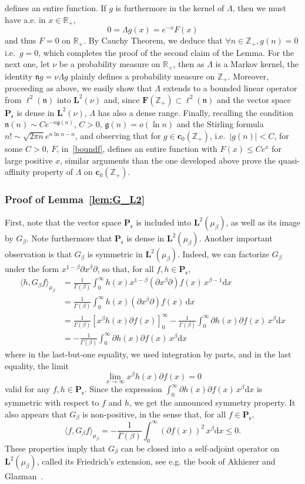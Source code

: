 \documentclass[10pt]{amsart}
\theoremstyle{definition}\newtheorem{defi}[theo]{Definition}\newtheorem{rema}[theo]{Remark}\newtheorem{exam}[theo]{Example}\newtheorem{exem}[theo]{Example}\newtheorem{nota}[theo]{Notation}
\newcommand{\RR}{\mathbb{R}}
\newcommand{\ZZ}{\mathbb{Z}}
\newcommand{\fe}{\mathfrak{e}}
\newcommand{\iy}{\infty}
\newcommand{\lt}{\left}
\newcommand{\pa}{\partial}
\newcommand{\ri}{\rightarrow}
\newcommand{\rt}{\right}
\newcommand{\Bg}{G}
\newcommand{\esP}{\mathbf{P}}
\newcommand{\esL}{\mathbf{L}}
\newcommand{\esLd}{\ell}
\newcommand{\esF}{\mathbf{F}}
\newcommand{\esc}{\mathbf{c}}
\newcommand{\esPe}{\esP_{\! \fe}}
\let\oldforall\forall
\renewcommand*{\forall}{\mathrel{\oldforall}}
\newcommand*{\dd}{\mathrm{d}}
\newcommand*{\dx}{\dd x}
\begin{document}
defines an entire function. If $g$ is furthermore in the kernel of $\Lambda$, then we must have a.e. in $x\in\RR_+$,
\[
0 = \Lambda g(x) = e^{-x}F(x)
\]
and thus $F=0$ on $\RR_+$. By Cauchy Theorem, we deduce that $\forall n\in\ZZ_+, g(n) =0$ i.e.~$g=0$, which completes the proof of the second claim of the Lemma. For the next one, let $\nu$ be a probability measure on $\RR_+$, then as $\Lambda$ is a Markov kernel, the identity $\mathfrak n g = \nu \Lambda g$ plainly defines a probability measure on $\ZZ_+$. Moreover, proceeding as above, we easily show that $\Lambda$ extends to a bounded linear operator from $\esLd^2(\mathfrak n)$ into $\esL^2(\nu)$ and, since $\esF(\ZZ_+) \subset \esLd^2(\mathfrak n) $ and the vector space $\esPe$ is dense in $\esL^2(\nu)$, $\Lambda$ has also a dense range. Finally, recalling the condition $\mathfrak{n}(n)\sim C e^{-n \mathfrak{g}(n)}$, $C>0$, $\mathfrak{g}(n)=o(\ln n)$ and the Stirling formula $n! \sim \sqrt{2 \pi n}e^{n \ln n -n}$, and observing that for $g\in \esc_0(\ZZ_+)$, i.e.~$|g(n)|<C $, for some $C>0$, $F$, in~\eqref{boundf}, defines an entire function with $F(x)\leq C e^{x}$ for large positive $x$, similar arguments than the one developed above prove the quasi-affinity property of $\Lambda$ on $\esc_0(\ZZ_+)$.


\subsubsection{Proof of Lemma~\ref{lem:G_L2}} First, note that the vector space $\esPe$ is included into $\esL^2(\mu_{\beta})$, as well as its image by $\Bg_{\beta}$. Note furthermore that $\esPe$ is dense in $\esL^2(\mu_{\beta})$. Another important observation is that $\Bg_{\beta}$ is symmetric in $\esL^2(\mu_{\beta})$. Indeed, we can factorize $\Bg_{\beta}$ under the form $x^{1-\beta}\pa x^{\beta}\pa$, so that, for all $ f, h \in \esPe,$
\begin{align*}
\langle h,\Bg_{\beta} f\rangle_{\mu_{\beta}}&=\frac1{\Gamma(\beta)}\int_0^{\iy} h(x) x^{1-\beta}(\pa x^{\beta}\pa) f(x)\, x^{\beta-1}\dx\\
&=\frac1{\Gamma(\beta)}\int_0^{\iy} h(x) (\pa x^{\beta}\pa) f(x)\, \dx\\
&=\frac1{\Gamma(\beta)}\lt[x^{\beta}h(x)\pa f(x)\rt]_0^{\iy}-\frac1{\Gamma(\beta)}\int_0^{\iy }
\pa h(x) \pa f(x)\, x^{\beta} \dx\\
&=-\frac1{\Gamma(\beta)}\int_0^{\iy}
\pa h(x) \pa f(x)\, x^{\beta} \dx
\end{align*}
where in the last-but-one equality, we used integration by parts, and in the last equality, the limit
\[
\lim_{x\ri\iy } x^{\beta}h(x)\pa f(x)=0
\]
valid for any $f,h\in\esPe$. Since the expression $\int_0^{\iy }
\pa h(x) \pa f(x)\, x^{\beta} \dx$ is symmetric with respect to $f$ and $h$, we get the announced symmetry property. It also appears that $\Bg_{\beta}$ is non-positive, in the sense that, for all $f\in\esPe,$
\[
\langle f,\Bg_{\beta} f\rangle_{\mu_{\beta}}= -\frac1{\Gamma(\beta)}\int_0^{\iy } (\pa f(x))^2\, x^{\beta} \dx
\leq 0.
\]
These properties imply that $\Bg_{\beta}$ can be closed into a self-adjoint operator on $\esL^2(\mu_{\beta})$, called its Friedrich's extension, see e.g. the book of Akhiezer and Glazman~\cite{MR615737}.
\end{document}
